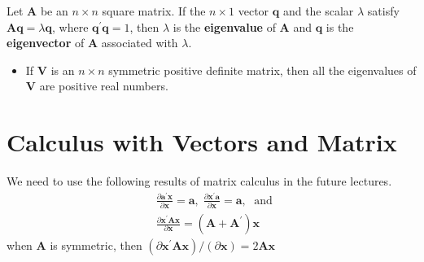 \documentclass[a4paper,11pt]{article}
\begin{document}
Let \(\mathbf{A}\) be an \(n \times n\) square matrix. If the \(n \times 1\)
vector \(\mathbf{q}\) and the scalar \(\lambda\) satisfy \(\mathbf{A}
\mathbf{q} = \lambda \mathbf{q}\), where \(\mathbf{q}^{\prime}
\mathbf{q} = 1\), then \(\lambda\) is the \textbf{eigenvalue} of \(\mathbf{A}\) and
\(\mathbf{q}\) is the \textbf{eigenvector} of \(\mathbf{A}\) associated with
\(\lambda\). 

\begin{itemize}
\item If \(\mathbf{V}\) is an \(n \times n\) symmetric positive definite
matrix, then all the eigenvalues of \(\mathbf{V}\) are positive real
numbers.
\end{itemize}

\section{Calculus with Vectors and Matrix}
\label{sec:org053b924}

We need to use the following results of matrix calculus in the future
lectures. 
\begin{align*}
& \frac{\partial \mathbf{a}^{\prime} \mathbf{x}}{\partial \mathbf{x}} = \mathbf{a},\; 
\frac{\partial \mathbf{x}^{\prime} \mathbf{a}}{\partial \mathbf{x}} = \mathbf{a},\; \text{ and } \\
& \frac{\partial \mathbf{x}^{\prime} \mathbf{A} \mathbf{x}}{\partial \mathbf{x}} = (\mathbf{A} + \mathbf{A}^{\prime}) \mathbf{x}
\end{align*}
when \(\mathbf{A}\) is symmetric, then \((\partial \mathbf{x}^{\prime}
\mathbf{A} \mathbf{x}) / (\partial \mathbf{x}) = 2\mathbf{A}
\mathbf{x}\)
\end{document}
